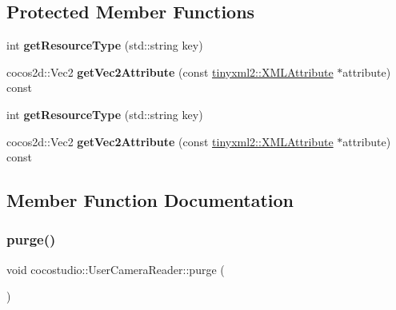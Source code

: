 \subsection*{Protected Member Functions}
\begin{DoxyCompactItemize}
\item 
\mbox{\label{classcocostudio_1_1UserCameraReader_a4c9873ab283fe750fe27c392579729c9}} 
int {\bfseries get\+Resource\+Type} (std\+::string key)
\item 
\mbox{\label{classcocostudio_1_1UserCameraReader_a13a2f2cb8933c592fcbc012a01bd85b3}} 
cocos2d\+::\+Vec2 {\bfseries get\+Vec2\+Attribute} (const \hyperlink{classtinyxml2_1_1XMLAttribute}{tinyxml2\+::\+X\+M\+L\+Attribute} $\ast$attribute) const
\item 
\mbox{\label{classcocostudio_1_1UserCameraReader_a4c9873ab283fe750fe27c392579729c9}} 
int {\bfseries get\+Resource\+Type} (std\+::string key)
\item 
\mbox{\label{classcocostudio_1_1UserCameraReader_a5edc2803aa6224b0bae2c6519906acd9}} 
cocos2d\+::\+Vec2 {\bfseries get\+Vec2\+Attribute} (const \hyperlink{classtinyxml2_1_1XMLAttribute}{tinyxml2\+::\+X\+M\+L\+Attribute} $\ast$attribute) const
\end{DoxyCompactItemize}


\subsection{Member Function Documentation}
\mbox{\label{classcocostudio_1_1UserCameraReader_a2af0072ffc30972ccb8172d9f9858fab}} 
\subsubsection{\texorpdfstring{purge()}{purge()}\hspace{0.1cm}{\footnotesize\ttfamily [1/2]}}
{\footnotesize\ttfamily void cocostudio\+::\+User\+Camera\+Reader\+::purge (\begin{DoxyParamCaption}{ }\end{DoxyParamCaption})\hspace{0.3cm}{\ttfamily [static]}}

